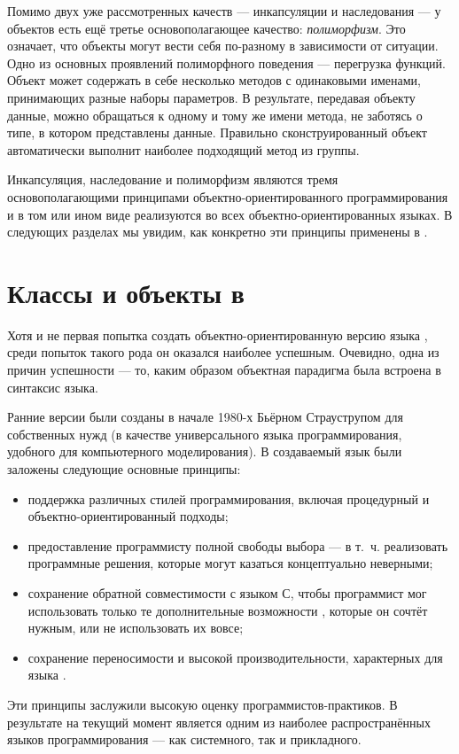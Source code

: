 Помимо двух уже рассмотренных качеств --- инкапсуляции и наследования --- у объектов есть ещё третье основополагающее
качество: \emph{полиморфизм}. Это означает, что объекты  могут вести себя
по-разному в зависимости от ситуации. Одно из основных проявлений полиморфного поведения --- перегрузка функций. Объект
может содержать в себе несколько методов с одинаковыми именами, принимающих разные наборы параметров. В результате,
передавая объекту данные, можно обращаться к одному и тому же имени метода, не заботясь о типе, в котором представлены
данные. Правильно сконструированный объект автоматически выполнит наиболее подходящий метод из группы.

Инкапсуляция, наследование и полиморфизм являются тремя основополагающими принципами объектно-ориентированного
программирования и в том или ином виде реализуются во всех объектно-ориентированных языках. В следующих разделах мы
увидим, как конкретно эти принципы применены в .

\section[Классы и объекты в \Sys{C++}]{Классы и объекты в }
Хотя  и не первая попытка создать объектно-ориентированную версию языка , среди попыток такого рода он оказался
наиболее успешным. Очевидно, одна из причин успешности --- то, каким образом объектная парадигма была встроена в
синтаксис языка. 

Ранние версии  были созданы в начале 1980-х Бьёрном Страуструпом для собственных нужд (в качестве универсального
языка программирования, удобного для компьютерного моделирования). В создаваемый язык были заложены следующие основные
принципы:

\begin{itemize}
\item поддержка различных стилей программирования, включая процедурный и объектно-ориентированный подходы;
\item предоставление программисту полной свободы выбора --- в т.~ч. реализовать программные решения, которые могут
казаться концептуально неверными;
\item сохранение обратной совместимости с языком С, чтобы программист мог использовать только те дополнительные
возможности , которые он сочтёт нужным, или не использовать их вовсе;
\item сохранение переносимости и высокой производительности, характерных для языка .
\end{itemize}
Эти принципы заслужили высокую оценку программистов-практиков. В результате на текущий момент  является одним из
наиболее распространённых языков программирования --- как системного, так и прикладного. 

